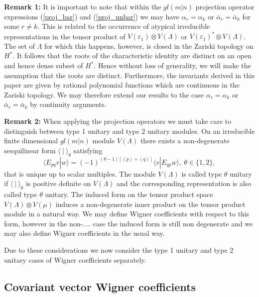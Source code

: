 \documentclass[12pt]{article}
\begin{document}
{\bf Remark 1:} 
It is important to note that within the $gl(m|n)$ projection operator expressions (\ref{proj_bar}) and (\ref{proj_unbar}) we may have $\alpha_r = \alpha_k$ or $\bar{\alpha}_r = \bar{\alpha}_k$ for some $r \neq k$. This is related to the occurrence of atypical irreducible representations in the tensor product
of $V({\varepsilon_1})\otimes V(\Lambda)$ or $V({\varepsilon_1})^*\otimes V(\Lambda)$. The
set of $\Lambda$ for which this happens, however, is closed in the Zariski topology
\cite{Hump1972} on $H^*$. It follows that the roots of the characteristic identity are distinct on an open and hence dense subset of
$H^*$. Hence without loss of generality, we will make the assumption that the roots are distinct. Furthermore, the invariants derived in this paper are given by rational
polynomial functions which are continuous in the Zariski topology. We may therefore extend our results to the case $\alpha_r = \alpha_k$ or $\bar{\alpha}_r = \bar{\alpha}_k$ by continuity arguments.

{\bf Remark 2:} 
When applying the projection operators we must take care to distinguish between type 1 unitary and type 2 unitary modules. On an irreducible finite dimensional $gl(m|n)$ module $V(\Lambda)$ there exists a non-degenerate sesquilinear form 
$\langle ~|~ \rangle_\theta$ satisfying 
$$
\langle E_{pq} v | w \rangle = (-1)^{(\theta - 1)[(p) + (q)]} \langle v | E_{qp} w \rangle , ~\theta  \in \{1,2\},
$$ 
that is unique up to scalar multiples. The module $V(\Lambda)$ is called type $\theta$ unitary if $\langle ~|~ \rangle_\theta$ is positive definite on $V(\Lambda)$ and the corresponding representation is also called type $\theta$ unitary. The induced form on the tensor product space $V(\Lambda) \otimes V(\mu)$ induces a non-degenerate inner product on the tensor product module in a natural way. We may define Wigner coefficients with respect to this form, however in the non-.... case the induced form is still non degenerate and we may also define Wigner coefficients in the usual way.

Due to these considerations we now consider the type 1 unitary and type 2 unitary cases of Wigner coefficients separately.

\subsection{Covariant vector Wigner coefficients}
\end{document}
